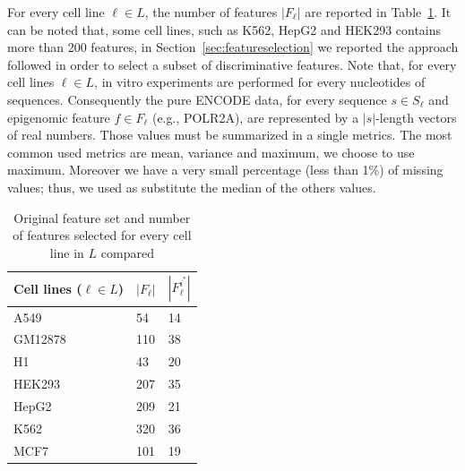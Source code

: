 For every cell line $\ell \in L$, the number of features $| F_\ell |$ are reported in Table~\ref{tab:featuressize}. It can be noted that, some cell lines, such as K562, HepG2 and HEK293 contains more than 200 features, in Section~\ref{sec:featureselection} we reported the approach followed in order to select a subset of discriminative features.
Note that, for every cell lines $\ell \in L$, in vitro experiments are
performed for every nucleotides of sequences. Consequently the pure ENCODE
data, for every sequence $s \in S_\ell$ and epigenomic feature $f \in
F_\ell$ (e.g., POLR2A), are represented by a $|s|$-length vectors of real
numbers. Those values must be summarized in a single metrics. The most
common used metrics are mean, variance and maximum, we choose to use
maximum. Moreover we have a very small percentage (less than 1\%) of
missing values; thus, we used as substitute the median of the others
values.
\begin{table}[t]
\centering
\begin{tabular}{|l|l|l|}
\hline
\textbf{Cell lines ($\ell \in L$)} & \textbf{$|F_\ell|$} & \textbf{$|F_\ell^{i^{*}}|$} \\ \hline
A549               & 54 & 14                  \\ \hline
GM12878            & 110 & 38                 \\ \hline
H1                 & 43 & 20                  \\ \hline
HEK293             & 207 & 35                 \\ \hline
HepG2              & 209 & 21                 \\ \hline
K562               & 320 & 36                 \\ \hline
MCF7               & 101 & 19                 \\ \hline
\end{tabular}
\caption{Original feature set and number of features selected for every cell line in $L$ compared}
\label{tab:featuressize}
\end{table}

